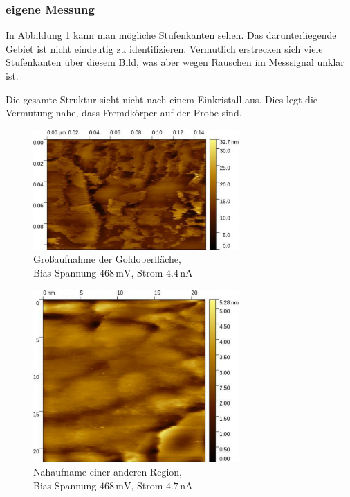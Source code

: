 \documentclass[12pt,a4paper]{scrartcl}
\numberwithin{equation}{section} %
\begin{document}
\hypertarget{eigene-messung}{%
\subsubsection{eigene Messung}\label{eigene-messung}}
In Abbildung \ref{abb:Gold gross} kann man mögliche Stufenkanten sehen. Das darunterliegende Gebiet ist nicht eindeutig zu identifizieren. Vermutlich erstrecken sich viele Stufenkanten über diesem Bild, was aber wegen Rauschen im Messsignal unklar ist.

Die gesamte Struktur sieht nicht nach einem Einkristall aus. Dies legt die Vermutung nahe, dass Fremdkörper auf der Probe sind.

\begin{figure}[ht]
	\centering
	\includegraphics[width=0.7\textwidth]{../media/B2.5/Gold_gross.pdf}
	\caption{Großaufnahme der Goldoberfläche, \\
		Bias-Spannung $468\mathrm{\,mV}$, Strom $4.4 \mathrm{\,nA}$}
	\label{abb:Gold gross}
\end{figure}
	
\begin{figure}[ht]
	\centering
	\includegraphics[width=0.7\textwidth]{../media/B2.5/Gold_Stufenkante.pdf}
	\caption{Nahaufname einer anderen Region, \\
		Bias-Spannung $468\mathrm{\,mV}$, Strom $4.7 \mathrm{\,nA}$}
	\label{abb:Gold stufe}
\end{figure}
\end{document}
